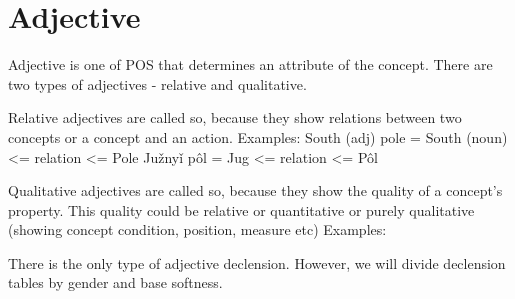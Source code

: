 \section{Adjective}


Adjective is one of POS that determines an attribute of the concept. There are two types of adjectives - relative and qualitative. 

Relative adjectives are called so, because they show relations between two concepts or a concept and an action.
Examples:
South (adj) pole = South (noun) <= relation <= Pole
Južnyǐ pôl = Jug <= relation <= Pôl

Qualitative adjectives are called so, because they show the quality of a concept’s property. This quality could be relative or quantitative or purely qualitative (showing concept condition, position, measure etc)
Examples:

There is the only type of adjective declension. However, we will divide declension tables by gender and base softness.
